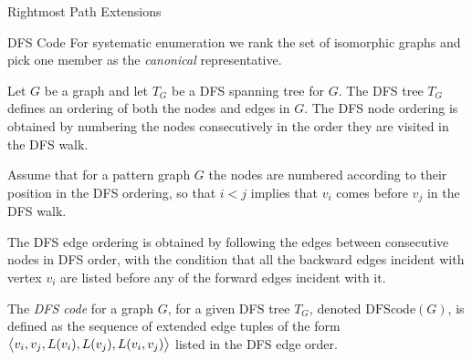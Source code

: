 \begin{frame}[fragile]{Rightmost Path Extensions}
\begin{figure}
  \centerline{
  }
\end{figure}
\end{frame}


\begin{frame}[fragile]{DFS Code}
  For systematic enumeration we rank the set of isomorphic graphs and 
  pick one member as the {\em canonical} representative.

  \medskip
Let $G$ be a graph and let $T_G$ be a DFS spanning tree for $G$.  The
DFS tree $T_G$ def\/{i}nes an ordering of both the nodes and edges in $G$.
The DFS node ordering is obtained by numbering the nodes consecutively
in the order they are visited in the DFS walk.

  \medskip
Assume that for a pattern graph $G$ the nodes are
numbered according to their position in the DFS ordering,
so that $i < j$ implies that $v_i$ comes
before $v_{j}$ in the DFS walk.

  \medskip
The DFS edge
ordering is obtained by following the edges between consecutive nodes in
DFS order, with the condition that all the backward edges
incident with vertex $v_i$ are listed before any of the forward edges
incident with it.  

\medskip
The {\em DFS code}
for a graph $G$, for a given DFS
tree $T_G$, denoted $\text{DFScode}(G)$, is def\/{i}ned as the sequence of
extended edge tuples of the form
${\big\langle v_i,v_{j},L(v_i),L(v_{j}),L(v_i,v_{j}) \big\rangle}$ listed in the DFS edge
order.
\end{frame}








